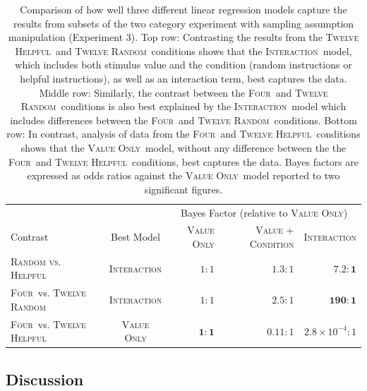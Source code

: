 \documentclass[doc,apacite]{apa6}
\newcommand{\four}{\textsc{Four}}
\newcommand{\random}{\textsc{Twelve Random}}
\newcommand{\helpful}{\textsc{Twelve Helpful}}
\newcommand{\bothtwelve}{\textsc{Random vs. Helpful}}
\newcommand{\neutral}{\textsc{Four}}
\newcommand{\valueonly}{\textsc{Value Only}}
\newcommand{\interaction}{\textsc{Interaction}}
\begin{document}
\begin{table}[tbp]
\hspace{-5mm}
\small
\begin{tabular}{lcrrr}
\toprule
 & & \multicolumn{3}{c}{Bayes Factor (relative to \valueonly)} \\
\cmidrule{3-5}
Contrast & Best Model & \valueonly & \textsc{Value + Condition} & \interaction \\
\midrule
\bothtwelve\ & \interaction & $1 : 1$ & $1.3 : 1$ & $\mathbf{7.2 : 1}$\\
\neutral\ vs. \random\ & \interaction & $1 : 1$ & $2.5 : 1$ & $\mathbf{190 : 1}$ \\
\neutral\ vs. \helpful\ & \valueonly & $\mathbf{1 : 1}$ & $0.11 : 1$ & $2.8 \times 10^{-4} :1$\\
\bottomrule
\end{tabular}
\caption{%
Comparison of how well three different linear regression models capture the results from subsets of the two category experiment with sampling assumption manipulation (Experiment 3).
%
Top row: Contrasting the results from the \helpful\ and \random\ conditions shows that the \interaction\ model, which includes both
stimulus value and the condition (random instructions or helpful instructions), as well as an interaction term, best captures the data.
%
Middle row: Similarly, the contrast between the \neutral\ and
\random\ conditions is also best explained by the \interaction\ model which includes differences between the \four\ and \random\ conditions.
%
Bottom row: In contrast, analysis of data from the \neutral\ and
\helpful\ conditions shows that the \valueonly\ model, without any difference between the the \four\ and \helpful\ conditions, best captures the data.
%
Bayes factors are expressed as odds ratios against the \valueonly\ model reported to two significant figures.
}
\label{tbl:exp3:bf1}
\end{table}





\subsection{Discussion}
\end{document}
